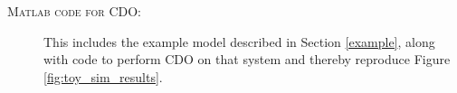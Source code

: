 \documentclass[12pt]{article}
\begin{document}
\begin{description}


\item[\scshape{Matlab} code for CDO:] This includes the example model described in Section \ref{example}, along with code to perform CDO on that system and thereby reproduce Figure \ref{fig:toy_sim_results}.


%

\end{description}




\end{document}
